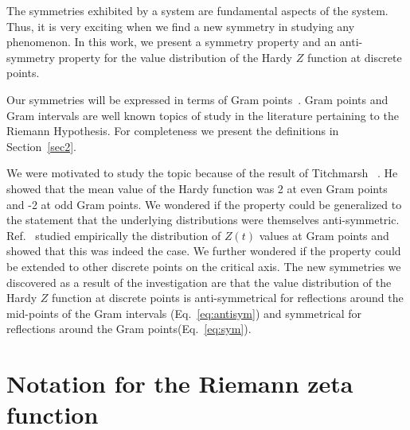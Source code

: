 \documentclass[twoside]{article}
\begin{document}
The symmetries exhibited by a system are fundamental aspects of the system. Thus, it is very exciting when we find a new symmetry in studying any phenomenon. In this work, we present a symmetry property and an anti-symmetry property for the value
distribution of the Hardy $Z$ function at discrete points.

Our symmetries will be expressed in terms of Gram points~\cite{Gram 1903}. Gram points and  Gram intervals are well known topics of study in the literature pertaining to the Riemann Hypothesis. For completeness we present the definitions in Section~\ref{sec2}.


We were motivated to study the topic because of the result of Titchmarsh~\cite{Titchmarsh 1934} . He showed that the mean value of the Hardy function was 2 at even Gram points and -2 at odd Gram points. We wondered if the property could be generalized to the statement that the underlying distributions were themselves anti-symmetric. Ref.~\cite{Shanker 2018a} studied empirically the distribution of $Z(t)$ values at Gram points and showed  that this was indeed the case. We further wondered if  the property could be extended to other discrete points on the critical axis. The new symmetries we discovered as a result of the investigation  are that the  value
distribution of the Hardy $Z$ function at discrete points is anti-symmetrical for reflections around the mid-points of the Gram intervals (Eq.~\ref{eq:antisym}) and symmetrical for reflections around the Gram points(Eq.~\ref{eq:sym}).



\section{\label{sec2}Notation for the Riemann zeta function}
\end{document}
